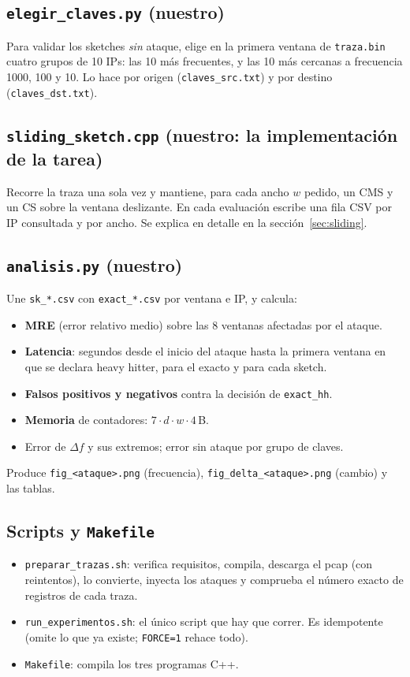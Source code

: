\documentclass[11pt]{article}
\newcommand{\code}[1]{\texttt{#1}}
\begin{document}
\subsection{\code{elegir\_claves.py} (nuestro)}
Para validar los sketches \emph{sin} ataque, elige en la primera ventana de \code{traza.bin} cuatro grupos de 10 IPs: las 10 más frecuentes, y las 10 más cercanas a frecuencia 1000, 100 y 10. Lo hace por origen (\code{claves\_src.txt}) y por destino (\code{claves\_dst.txt}).

\subsection{\code{sliding\_sketch.cpp} (nuestro: la implementación de la tarea)}
Recorre la traza una sola vez y mantiene, para cada ancho $w$ pedido, un CMS y un CS sobre la ventana deslizante. En cada evaluación escribe una fila CSV por IP consultada y por ancho. Se explica en detalle en la sección~\ref{sec:sliding}.

\subsection{\code{analisis.py} (nuestro)}
Une \code{sk\_*.csv} con \code{exact\_*.csv} por ventana e IP, y calcula:
\begin{itemize}
    \item \textbf{MRE} (error relativo medio) sobre las 8 ventanas afectadas por el ataque.
    \item \textbf{Latencia}: segundos desde el inicio del ataque hasta la primera ventana en que se declara heavy hitter, para el exacto y para cada sketch.
    \item \textbf{Falsos positivos y negativos} contra la decisión de \code{exact\_hh}.
    \item \textbf{Memoria} de contadores: $7\cdot d\cdot w\cdot 4$\,B.
    \item Error de $\Delta f$ y sus extremos; error sin ataque por grupo de claves.
\end{itemize}
Produce \code{fig\_<ataque>.png} (frecuencia), \code{fig\_delta\_<ataque>.png} (cambio) y las tablas.

\subsection{Scripts y \code{Makefile}}
\begin{itemize}
    \item \code{preparar\_trazas.sh}: verifica requisitos, compila, descarga el pcap (con reintentos), lo convierte, inyecta los ataques y comprueba el número exacto de registros de cada traza.
    \item \code{run\_experimentos.sh}: el único script que hay que correr. Es idempotente (omite lo que ya existe; \code{FORCE=1} rehace todo).
    \item \code{Makefile}: compila los tres programas C++.
\end{itemize}
\end{document}
